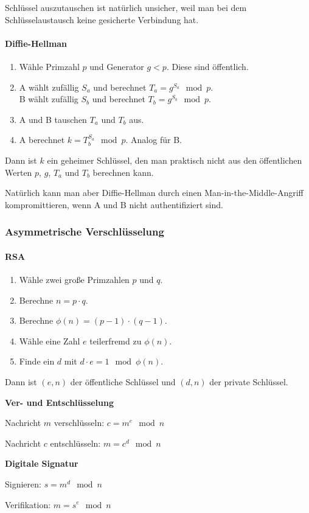 \documentclass[a4paper,parskip=half*,DIV=15,fontsize=11pt]{scrartcl}
\begin{document}
Schlüssel auszutauschen ist natürlich unsicher, weil man bei dem Schlüsselaustausch keine gesicherte Verbindung hat.

\paragraph{Diffie-Hellman}

\begin{enumerate}
\item Wähle Primzahl $p$ und Generator $g < p$. Diese sind öffentlich.
\item A wählt zufällig $S_a$ und berechnet $T_a = g^{S_a} \mod p$.\\
      B wählt zufällig $S_b$ und berechnet $T_b = g^{S_b} \mod p$.
\item A und B tauschen $T_a$ und $T_b$ aus.
\item A berechnet $k = T_b^{S_a} \mod p$. Analog für B.
\end{enumerate}

Dann ist $k$ ein geheimer Schlüssel, den man praktisch nicht aus den öffentlichen Werten $p$, $g$, $T_a$ und $T_b$ berechnen kann.

Natürlich kann man aber Diffie-Hellman durch einen Man-in-the-Middle-Angriff kompromittieren, wenn A und B nicht authentifiziert sind.

\subsubsection{Asymmetrische Verschlüsselung}

\paragraph{RSA}

\begin{enumerate}
\item Wähle zwei große Primzahlen $p$ und $q$.
\item Berechne $n = p \cdot q$.
\item Berechne $\phi(n) = (p - 1) \cdot (q - 1)$.
\item Wähle eine Zahl $e$ teilerfremd zu $\phi(n)$.
\item Finde ein $d$ mit $d \cdot e = 1 \mod \phi(n)$.
\end{enumerate}

Dann ist $(e, n)$ der öffentliche Schlüssel und $(d, n)$ der private Schlüssel.

\begin{minipage}[t]{0.5\textwidth}
\textbf{Ver- und Entschlüsselung}

Nachricht $m$ verschlüsseln: $c = m^e \mod n$

Nachricht $c$ entschlüsseln: $m = c^d \mod n$
\end{minipage}
\begin{minipage}[t]{0.5\textwidth}
\textbf{Digitale Signatur}

Signieren: $s = m^d \mod n$

Verifikation: $m = s^e \mod n$
\end{minipage}
\end{document}
